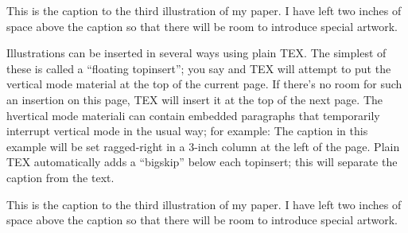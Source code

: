 \topinsert \vskip 2in
\hsize=3in \raggedright
{} This is the caption to the
third illustration of my paper. I have left two inches
of space above the caption so that there will be room
to introduce special artwork. \endinsert

Illustrations can be inserted in several ways using plain TEX. The simplest of
these is called a “floating topinsert”; you say and TEX will attempt to put the vertical mode material at the top of the current page.
If there’s no room for such an insertion on this page, TEX will insert it at the top of
the next page. The hvertical mode materiali can contain embedded paragraphs that
temporarily interrupt vertical mode in the usual way; for example:
The caption in this example will be set ragged-right in a 3-inch column at the left of
the page. Plain TEX automatically adds a “bigskip” below each topinsert; this will
separate the caption from the text.

\topinsert \vskip 2in
\hsize=3in \raggedright
{} This is the caption to the
third illustration of my paper. I have left two inches
of space above the caption so that there will be room
to introduce special artwork. \endinsert

\bye

